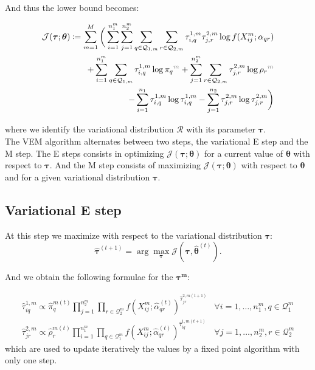 \documentclass[12pt,a4paper]{report}
\begin{document}
And thus the lower bound becomes:

\begin{align*}
    \mathcal{J}(\bm{\tau};\bm{\theta}) \coloneqq \sum_{m=1}^{M} \bigg(\sum_{i = 1}^{n_1^m}\sum_{j=1}^{n_2^m}\sum_{q \in \mathcal{Q}_{1,m}} \sum_{r \in \mathcal{Q}_{2,m}} \tau^{1,m}_{i,q} \tau^{2,m}_{j,r} \log f(X^{m}_{ij}; \alpha_{qr}) \\
        + \sum_{i=1}^{n_1^m} \sum_{q \in \mathcal{Q}_{1,m}} \tau^{1,m}_{i,q} \log \pi_{\color{black}q}^{\color{gray}m} + \sum_{j=1}^{n_2^m} \sum_{r \in \mathcal{Q}_{2,m}} \tau^{2,m}_{j,r} \log \rho_{\color{black}r}^{\color{gray}m} \\
        - \sum_{i=1}^{n_1} \tau^{1,m}_{i,q} \log \tau^{1,m}_{i,q} - \sum_{j=1}^{n_2} \tau^{2,m}_{j,r} \log \tau^{2,m}_{j,r} \bigg) \color{black}
\end{align*}

where we identify the variational distribution $\mathcal{R}$ with its parameter
$\bm{\tau}$. \\




The VEM algorithm alternates between two steps, the variational E step and the M step.
The E steps consists in optimizing $\mathcal{J}(\bm{\tau};\bm{\theta})$ for a
current value of $\bm{\theta}$ with respect to $\bm{\tau}$. And the M step
consists of maximizing $\mathcal{J}(\bm{\tau};\bm{\theta})$ with respect to
$\bm{\theta}$ and for a given variational distribution $\bm{\tau}$.

\subsection{Variational E step}
\label{ssec:variational-e-step}

At this step we maximize with respect to the variational distribution $\bm{\tau}$:
$$\widehat{\bm{\tau}}^{(t+1)} = \arg \max_{\bm{\tau}} \mathcal{J}(\mathcal{\bm{\tau}},\bm{\widehat{\theta}}^{(t)}).$$

And we obtain the following formulae for the $\bm{\tau^m}$:

\begin{align*}
    \widehat{\tau}_{iq}^{1,m} \propto \widehat{\pi}_{q}^{m(t)} \prod_{j=1}^{n_2^m}\prod_{r\in\mathcal{Q}_2^m} f(X_{ij}^m;\widehat{\alpha}_{qr}^{(t)})^{\widehat{\tau}_{jr}^{2,m(t+1)}}  & \forall i = 1, \dots , n_1^m, q \in \mathcal{Q}_1^m \\
    \widehat{\tau}_{jr}^{2,m} \propto \widehat{\rho}_{r}^{m(t)} \prod_{i=1}^{n_1^m}\prod_{q\in\mathcal{Q}_1^m} f(X_{ij}^m;\widehat{\alpha}_{qr}^{(t)})^{\widehat{\tau}_{iq}^{1,m(t+1)}} & \forall j = 1, \dots , n_2^m, r \in \mathcal{Q}_2^m
\end{align*}
which are used to update iteratively the values by a fixed point algorithm with
only one step.
\end{document}
